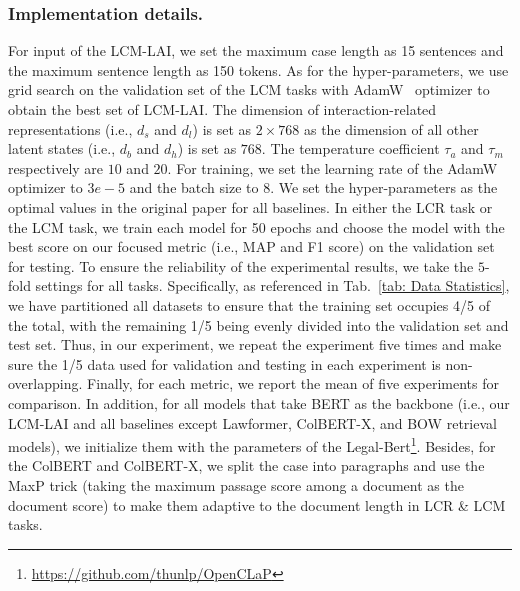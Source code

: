 \subsubsection{Implementation details.} \label{sec: hyperparametter_setting}
For input of the LCM-LAI, we set the maximum case length as 15 sentences and the maximum sentence length as 150 tokens.
As for the hyper-parameters, we use grid search on the validation set of the LCM tasks with AdamW~\cite{loshchilov2018AdamW} optimizer to obtain the best set of LCM-LAI.
The dimension of interaction-related representations (i.e., $d_s$ and $d_l$) is set as $2 \times 768$ as the dimension of all other latent states (i.e., $d_b$ and $d_h$) is set as $768$.
The temperature coefficient $\tau_{a}$ and $\tau_{m}$ respectively are $10$ and $20$.
For training, we set the learning rate of the AdamW optimizer to $3e-5$ and the batch size to $8$.
We set the hyper-parameters as the optimal values in the original paper for all baselines.
In either the LCR task or the LCM task, we train each model for 50 epochs and choose the model with the best score on our focused metric (i.e., MAP and F1 score) on the validation set for testing.
To ensure the reliability of the experimental results, we take the $5$-fold settings for all tasks.
Specifically, as referenced in Tab.~\ref{tab: Data Statistics}, we have partitioned all datasets to ensure that the training set occupies 4/5 of the total, with the remaining 1/5 being evenly divided into the validation set and test set.
Thus, in our experiment, we repeat the experiment five times and make sure the 1/5 data used for validation and testing in each experiment is non-overlapping.
Finally, for each metric, we report the mean of five experiments for comparison.
In addition, for all models that take BERT as the backbone (i.e., our LCM-LAI and all baselines except Lawformer, ColBERT-X, and BOW retrieval models), we initialize them with the parameters of the Legal-Bert\footnote{\url{https://github.com/thunlp/OpenCLaP}}.
Besides, for the ColBERT and ColBERT-X, we split the case into paragraphs and use the MaxP trick (taking the maximum passage score among a document as the document score) to make them adaptive to the document length in LCR \& LCM tasks.
